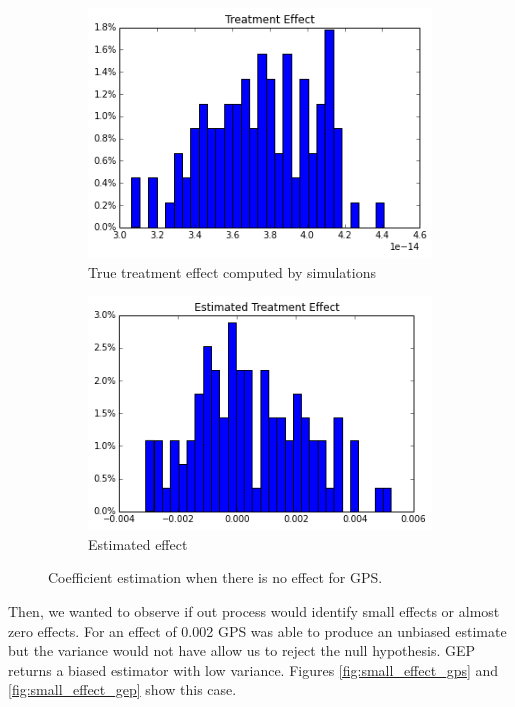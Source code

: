 \documentclass[11pt]{article}
\begin{document}
\begin{figure}[h]
\centering
\begin{subfigure}{.5\textwidth}
  \centering
  \includegraphics[width=.9\linewidth]{treatment_effect_no_influence_real.png}
  \caption{True treatment effect computed by simulations}
  \label{fig:sub1}
\end{subfigure}%
\begin{subfigure}{.5\textwidth}
  \centering
  \includegraphics[width=.9\linewidth]{estimated_no_influence_gep.png}
  \caption{Estimated effect}
  \label{fig:sub2}
\end{subfigure}
\caption{Coefficient estimation when there is no effect for GPS.}
\label{fig:no_effect_gep}
\end{figure}

Then, we  wanted to observe if out process would identify small effects or almost zero effects. For an effect of 0.002 GPS was able to produce an unbiased estimate but the variance would not have allow us to reject the null hypothesis. GEP returns a biased estimator with low variance. Figures \ref{fig:small_effect_gps} and \ref{fig:small_effect_gep} show this case. 
\end{document}
